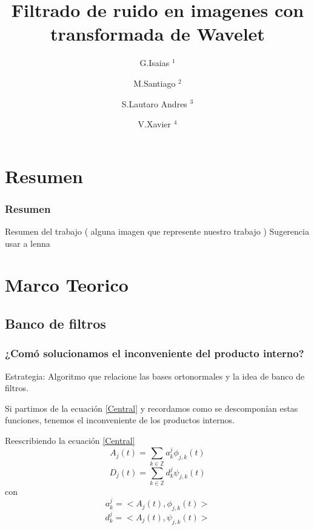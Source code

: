 \documentclass{beamer}
\title{Filtrado de ruido en imagenes con transformada de Wavelet}
\author{
  G.Isaias $^1$ \and   
  M.Santiago $^2$ \and 
  S.Lautaro Andres $^3$ \and
  V.Xavier $^4$ 
}
\institute{
  $^{1-2-3-4}$ Universidad Nacional del Comahue \\ 
  Buenos Aires , Neuquen \\ 
}
\date{}
\begin{document}
    
  \begin{frame}
    \titlepage  
  \end{frame}

  \begin{frame}
    \tableofcontents
  
    
  
  \end{frame}

  \section{Resumen}

  \begin{frame}
    \frametitle{Resumen}
    
    Resumen del trabajo ( alguna imagen que represente nuestro trabajo )
    Sugerencia usar a lenna
  
  \end{frame}

  \section{Marco Teorico}

  \subsection{Banco de filtros}
  
  \begin{frame}
    \frametitle{¿Comó solucionamos el inconveniente del producto interno?}
    
    Estrategia: Algoritmo que relacione las bases ortonormales y la idea de banco de filtros.
      
     Si partimos de la ecuación \ref{Central} y recordamos como se descomponían estas funciones, tenemos el inconveniente de los productos internos.
        
  \end{frame}

   \begin{frame}

Reescribiendo la ecuación \ref{Central} 
   \begin{equation}
\label{Aj}
A_j(t)=\sum_{k \in \mathbb Z}  a^{j}_{k} \phi _{j,k}(t)
\end{equation} 
\begin{equation}
\label{Dj}
D_j(t)=\sum_{k \in \mathbb Z}  d^{j}_{k} \psi _{j,k}(t)
\end{equation} 
con
\begin{equation}
\label{ajk}
a^{j}_{k}= <A_{j}(t), \phi _{j,k}(t)>
\end{equation}
\begin{equation}
\label{ajk}
d^{j}_{k}= <A_{j}(t), \psi _{j,k}(t)>
\end{equation}
    \end{frame}
    
\end{document}
